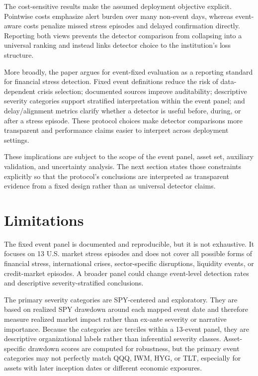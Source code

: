 \documentclass[10pt,twocolumn]{article}
\begin{document}
The cost-sensitive results make the assumed deployment objective explicit. Pointwise costs emphasize alert burden over many non-event days, whereas event-aware costs penalize missed stress episodes and delayed confirmation directly. Reporting both views prevents the detector comparison from collapsing into a universal ranking and instead links detector choice to the institution's loss structure.

More broadly, the paper argues for event-fixed evaluation as a reporting standard for financial stress detection. Fixed event definitions reduce the risk of data-dependent crisis selection; documented sources improve auditability; descriptive severity categories support stratified interpretation within the event panel; and delay/alignment metrics clarify whether a detector is useful before, during, or after a stress episode. These protocol choices make detector comparisons more transparent and performance claims easier to interpret across deployment settings.

These implications are subject to the scope of the event panel, asset set, auxiliary validation, and uncertainty analysis. The next section states those constraints explicitly so that the protocol's conclusions are interpreted as transparent evidence from a fixed design rather than as universal detector claims.

\section{Limitations}
The fixed event panel is documented and reproducible, but it is not exhaustive. It focuses on 13 U.S. market stress episodes and does not cover all possible forms of financial stress, international crises, sector-specific disruptions, liquidity events, or credit-market episodes. A broader panel could change event-level detection rates and descriptive severity-stratified conclusions.

The primary severity categories are SPY-centered and exploratory. They are based on realized SPY drawdown around each mapped event date and therefore measure realized market impact rather than ex-ante severity or narrative importance. Because the categories are terciles within a 13-event panel, they are descriptive organizational labels rather than inferential severity classes. Asset-specific drawdown scores are computed for robustness, but the primary event categories may not perfectly match QQQ, IWM, HYG, or TLT, especially for assets with later inception dates or different economic exposures.
\end{document}
